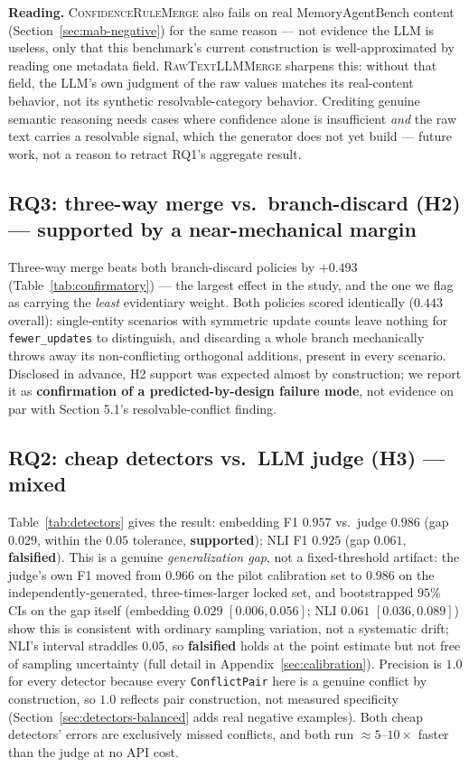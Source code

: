 \documentclass[11pt]{article}
\begin{document}
\textbf{Reading.} \textsc{ConfidenceRuleMerge} also fails on real
MemoryAgentBench content (Section~\ref{sec:mab-negative}) for the same
reason --- not evidence the LLM is useless, only that this benchmark's
current construction is well-approximated by reading one metadata field.
\textsc{RawTextLLMMerge} sharpens this: without that field, the LLM's own
judgment of the raw values matches its real-content behavior, not its
synthetic resolvable-category behavior. Crediting genuine semantic reasoning
needs cases where confidence alone is insufficient \emph{and} the raw text
carries a resolvable signal, which the generator does not yet build ---
future work, not a reason to retract RQ1's aggregate result.

\subsection{RQ3: three-way merge vs.\ branch-discard (H2) --- supported by a near-mechanical margin}

Three-way merge beats both branch-discard policies by $+0.493$
(Table~\ref{tab:confirmatory}) --- the largest effect in the study, and the
one we flag as carrying the \emph{least} evidentiary weight. Both policies
scored identically ($0.443$ overall): single-entity scenarios with
symmetric update counts leave nothing for \texttt{fewer\_updates} to
distinguish, and discarding a whole branch mechanically throws away its
non-conflicting orthogonal additions, present in every scenario. Disclosed
in advance, H2 support was expected almost by construction; we report it as
\textbf{confirmation of a predicted-by-design failure mode}, not evidence
on par with Section 5.1's resolvable-conflict finding.

\subsection{RQ2: cheap detectors vs.\ LLM judge (H3) --- mixed}

Table~\ref{tab:detectors} gives the result: embedding F1 $0.957$ vs.\ judge
$0.986$ (gap $0.029$, within the $0.05$ tolerance, \textbf{supported}); NLI F1
$0.925$ (gap $0.061$, \textbf{falsified}). This is a genuine
\emph{generalization gap}, not a fixed-threshold artifact: the judge's own
F1 moved from $0.966$ on the pilot calibration set to $0.986$ on the
independently-generated, three-times-larger locked set, and bootstrapped
$95\%$ CIs on the gap itself (embedding $0.029$ $[0.006,0.056]$; NLI $0.061$
$[0.036,0.089]$) show this is consistent with ordinary sampling variation,
not a systematic drift; NLI's interval straddles $0.05$, so
\textbf{falsified} holds at the point estimate but not free of sampling
uncertainty (full detail in Appendix~\ref{sec:calibration}). Precision is
$1.0$ for every detector because every \texttt{ConflictPair} here is a
genuine conflict by construction, so $1.0$ reflects pair construction, not
measured specificity (Section~\ref{sec:detectors-balanced} adds real
negative examples). Both cheap detectors' errors are exclusively missed
conflicts, and both run $\approx\!5$--$10\times$ faster than the judge at
no API cost.
\end{document}
